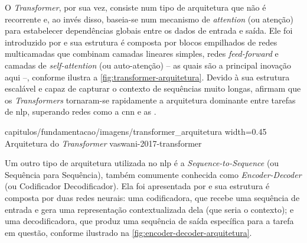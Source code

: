 O \textit{Transformer}, por sua vez, consiste num tipo de arquitetura que não é recorrente e, ao invés disso, baseia-se num mecanismo de \textit{attention} (ou atenção) para estabelecer dependências globais entre os dados de entrada e saída.
Ele foi introduzido por  e sua estrutura é composta por blocos empilhados de redes multicamadas que combinam camadas lineares simples, redes \textit{feed-forward} e camadas de \textit{self-attention} (ou auto-atenção) -- as quais são a principal inovação aqui --, conforme ilustra a \autoref{fig:transformer-arquitetura}.
Devido à sua estrutura escalável e capaz de capturar o contexto de sequências muito longas,  afirmam que os \textit{Transformers} tornaram-se rapidamente a arquitetura dominante entre tarefas de \acrshort{nlp}, superando redes como a \acrfull{cnn} e as .

{capitulos/fundamentacao/imagens/transformer_arquitetura}
{width=0.45\textwidth}
{Arquitetura do \textit{Transformer}}
{vaswani-2017-transformer}




Um outro tipo de arquitetura utilizada no \acrshort{nlp} é a \textit{Sequence-to-Sequence} (ou Sequência para Sequência), também comumente conhecida como \textit{Encoder-Decoder} (ou Codificador Decodificador). Ela foi apresentada por  e sua estrutura é composta por duas redes neurais: uma codificadora, que recebe uma sequência de entrada e gera uma representação contextualizada dela (que seria o contexto); e uma decodificadora, que produz uma sequência de saída específica para a tarefa em questão, conforme ilustrado na \autoref{fig:encoder-decoder-arquitetura}. 

